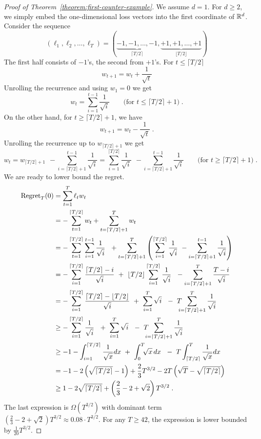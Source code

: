 \begin{proof}[Proof of Theorem~\ref{theorem:first-counter-example}]
We assume $d=1$. For $d \ge 2$, we simply embed the one-dimensional loss
vectors into the first coordinate of $\mathbb{R}^d$.  Consider the sequence
$$
(\ell_1, \ell_2, \dots, \ell_T) = ( \underbrace{- 1, -1, \dots, -1}_{\lceil T/2 \rceil}, \underbrace{+1, +1, \dots, +1}_{\lfloor T/2 \rfloor})
$$
The first half consists of $-1$'s, the second from $+1$'s. For $t \le \lceil T/2 \rceil$
$$
w_{t+1} = w_t + \frac{1}{\sqrt{t}}
$$
Unrolling the recurrence and using $w_1 = 0$ we get
$$
w_t = \sum_{i=1}^{t-1} \frac{1}{\sqrt{i}} \qquad \text{(for $t \le \lceil T/2 \rceil + 1$)} \; .
$$
On the other hand, for $t \ge \lceil T/2 \rceil + 1$, we have
$$
w_{t+1} = w_t - \frac{1}{\sqrt{t}} \; .
$$
Unrolling the recurrence up to $w_{\lceil T/2 \rceil + 1}$ we get
$$
w_t
= w_{\lceil T/2 \rceil + 1} \ \ - \sum_{i=\lceil T/2 \rceil + 1}^{t-1} \frac{1}{\sqrt{i}}
= \sum_{i=1}^{\lceil T/2 \rceil} \frac{1}{\sqrt{i}} \ \ - \sum_{i=\lceil T/2 \rceil + 1}^{t-1} \frac{1}{\sqrt{i}}
\qquad \text{(for $t \ge \lceil T/2 \rceil + 1$)} \; .
$$
We are ready to lower bound the regret.
\begin{align*}
\Regret_T(0)
& = \sum_{t=1}^T \ell_t w_t \\
& = - \sum_{t=1}^{\lceil T/2 \rceil} w_t + \sum_{t=\lceil T/2 \rceil + 1}^T w_t  \\
& = - \sum_{t=1}^{\lceil T/2 \rceil} \sum_{i=1}^{t-1} \frac{1}{\sqrt{i}} \ \ + \sum_{t=\lceil T/2 \rceil + 1}^T \left( \sum_{i=1}^{\lceil T/2 \rceil} \frac{1}{\sqrt{i}} \ - \sum_{i=\lceil T/2 \rceil + 1}^{t-1} \frac{1}{\sqrt{i}} \right) \\
& = - \sum_{i=1}^{\lceil T/2 \rceil} \frac{\lceil T/2 \rceil - i}{\sqrt{i}} \ + \ \lfloor T/2 \rfloor \sum_{i=1}^{\lceil T/2 \rceil} \frac{1}{\sqrt{i}} \ \ - \sum_{i=\lceil T/2 \rceil + 1}^T \frac{T - i}{\sqrt{i}} \\
& = - \sum_{i=1}^{\lceil T/2 \rceil} \frac{\lceil T/2 \rceil - \lfloor T/2 \rfloor}{\sqrt{i}} \ + \ \sum_{i=1}^{T} \sqrt{i} \ \ - \ T \!\!\!\! \sum_{i=\lceil T/2 \rceil + 1}^T \frac{1}{\sqrt{i}} \\
& \ge - \sum_{i=1}^{\lceil T/2 \rceil} \frac{1}{\sqrt{i}} \ \ + \ \sum_{i=1}^{T} \sqrt{i} \ \ - \ T \!\!\!\! \sum_{i=\lceil T/2 \rceil + 1}^T \frac{1}{\sqrt{i}} \\
& \ge - 1 - \int_{i=1}^{\lceil T/2 \rceil} \frac{1}{\sqrt{x}} dx \ + \ \int_{0}^T \!\!\! \sqrt{x} \, dx \ \ - \ T \int_{\lceil T/2 \rceil}^T \frac{1}{\sqrt{x}} dx \\
& = - 1 - 2\left(\sqrt{\lceil T/2 \rceil} - 1 \right) + \frac{2}{3} T^{3/2} - 2 T \left(\sqrt{T} - \sqrt{\lceil T/2 \rceil} \right) \\
& \ge 1 - 2 \sqrt{\lceil T/2 \rceil} + \left( \frac{2}{3} - 2 + \sqrt{2} \right) T^{3/2} \; .
\end{align*}
The last expression is $\Omega(T^{3/2})$ with dominant term $(\frac{2}{3} - 2 +
\sqrt{2}) T^{3/2} \approx 0.08 \cdot T^{3/2}$.  For any $T \ge 42$, the
expression is lower bounded by $\frac{1}{20} T^{3/2}$.
\end{proof}


